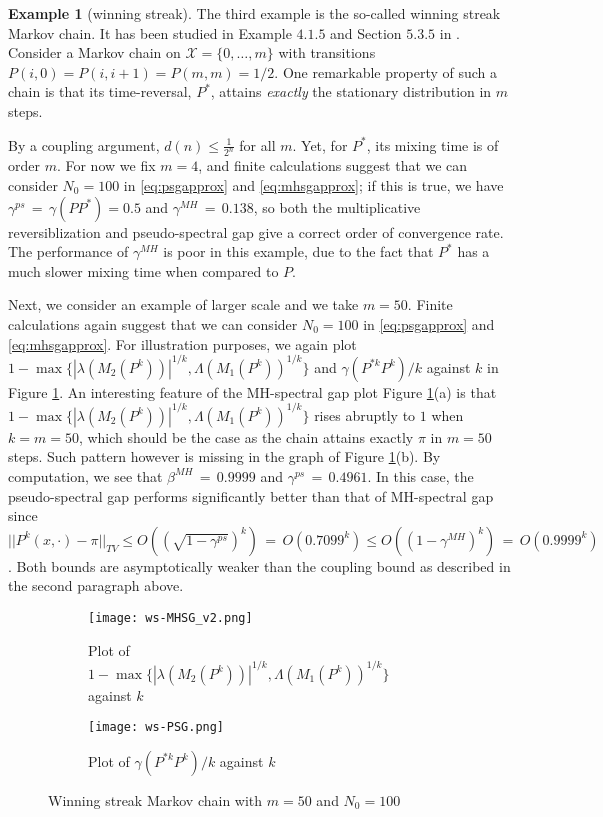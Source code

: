 \documentclass[12pt,a4]{amsart}
\numberwithin{equation}{section}
\theoremstyle{plain}
\theoremstyle{definition}
\newtheorem{example}{Example}[section]
\theoremstyle{remark}
\newcommand{\1}{\mathds{1}}
\renewcommand{\leq}{\leqslant}
\begin{document}
\begin{example}[winning streak]\label{ex:3}
	The third example is the so-called winning streak Markov chain. It has been studied in Example $4.1.5$ and Section $5.3.5$ in \cite{LPW09}. Consider a Markov chain on $\mathcal{X} = \{0,\ldots,m\}$ with transitions $P(i,0) = P(i,i+1) = P(m,m) = 1/2$. One remarkable property of such a chain is that its time-reversal, $P^*$, attains \textit{exactly} the stationary distribution in $m$ steps.
	
	By a coupling argument, $d(n) \leq \frac{1}{2^n}$ for all $m$. Yet, for $P^*$, its mixing time is of order $m$. For now we fix $m = 4$, and finite calculations suggest that we can consider $N_0 = 100$ in \eqref{eq:psgapprox} and \eqref{eq:mhsgapprox}; if this is true, we have $\gamma^{ps} {\, = \,} \gamma(PP^*) = 0.5$ and $\gamma^{MH} {\, = \,} 0.138$, so both the multiplicative reversiblization and pseudo-spectral gap give a correct order of convergence rate. The performance of $\gamma^{MH}$ is poor in this example, due to the fact that $P^*$ has a much slower mixing time when compared to $P$.
	
	Next, we consider an example of larger scale and we take $m = 50$. Finite calculations again suggest that we can consider $N_0 = 100$ in \eqref{eq:psgapprox} and \eqref{eq:mhsgapprox}. For illustration purposes, we again plot $1-\max \{ |\lambda(M_2(P^k))|^{1/k}, \Lambda(M_1(P^k))^{1/k} \}$ and $\gamma(P^{*k}P^k)/k$ against $k$ in Figure \ref{fig:ws}. An interesting feature of the MH-spectral gap plot Figure \ref{fig:ws}(a) is that $1-\max \{ |\lambda(M_2(P^k))|^{1/k}, \Lambda(M_1(P^k))^{1/k} \}$ rises abruptly to $1$ when $k = m = 50$, which should be the case as the chain attains exactly $\pi$ in $m = 50$ steps. Such pattern however is missing in the graph of Figure \ref{fig:ws}(b). By computation, we see that $\beta^{MH} {\, = \,} 0.9999$ and $\gamma^{ps} {\, = \,} 0.4961$. In this case, the pseudo-spectral gap performs significantly better than that of MH-spectral gap since
	$||P^k(x,\cdot) - \pi||_{TV} \leq O((\sqrt{1-\gamma^{ps}})^k) {\, = \,} O(0.7099^k) \leq O((1-\gamma^{MH})^k) {\, = \,} O(0.9999^k)$. Both bounds are asymptotically weaker than the coupling bound as described in the second paragraph above.
\end{example}


\begin{figure}[H]
	\centering
	\begin{subfigure}{0.5\textwidth}
		\centering
		\texttt{[image: ws-MHSG\_v2.png]}
		\caption{Plot of $1-\max \{ |\lambda(M_2(P^k))|^{1/k}, \Lambda(M_1(P^k))^{1/k} \}$ against $k$}
	\end{subfigure}%
	\begin{subfigure}{0.5\textwidth}
		\centering
		\texttt{[image: ws-PSG.png]}
		\caption{Plot of $\gamma(P^{*k}P^k)/k$ against $k$}
	\end{subfigure}
	\caption{Winning streak Markov chain with $m = 50$ and $N_0 = 100$}
	\label{fig:ws}
\end{figure}
\end{document}
